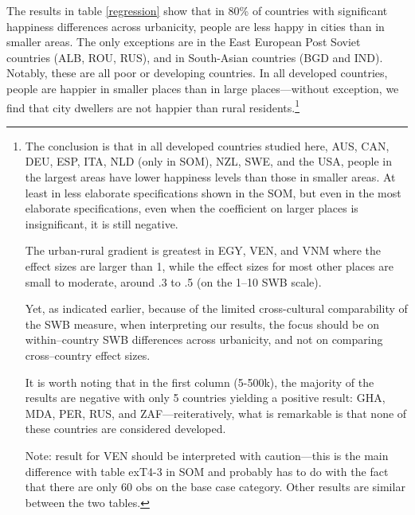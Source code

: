 \documentclass[11pt, letterpaper]{article}
\begin{document}
The results in table \ref{regression} %
show that in 80\% of countries with significant happiness differences across
urbanicity, people are less happy in cities than in smaller areas. The only exceptions are in the East European Post Soviet countries (ALB, ROU, RUS), and in South-Asian countries (BGD and IND). Notably, these are all poor or developing countries. In all developed countries, people are happier in smaller places than in large places---without exception, we find that city dwellers are not happier than rural residents.\footnote{ 

%

The conclusion is that in all developed countries studied here, AUS, CAN, DEU, ESP, ITA,
NLD ({only in SOM}), NZL, SWE, and the USA, people in the largest areas have
lower happiness levels than those in smaller areas. {At least in less elaborate specifications shown in the SOM, but even in the most elaborate specifications, even when the coefficient on larger places is insignificant, it is still negative.}


The urban-rural gradient is greatest in EGY, VEN, and VNM where the effect sizes are larger than 1, while the effect sizes for most other places are small to moderate, around .3 to .5 (on the 1--10 SWB scale).   
 
Yet, as indicated earlier, because of the limited cross-cultural comparability of the SWB measure, when interpreting our results, the focus should be on within--country SWB differences across urbanicity, and not on comparing cross--country effect sizes.
 
It is worth noting that in the first column (5-500k), the majority of the results are
negative with only 5 countries yielding a positive result: GHA, MDA, PER, RUS,
and ZAF---reiteratively, what is remarkable is that none of these countries are considered developed.
 
{Note: result for VEN
  should be interpreted with caution---this is the main difference with table
  exT4-3 in SOM and probably has to do with the fact that there are only 60 obs on the base case category. Other results are
  similar between the two tables.}

}
\end{document}
